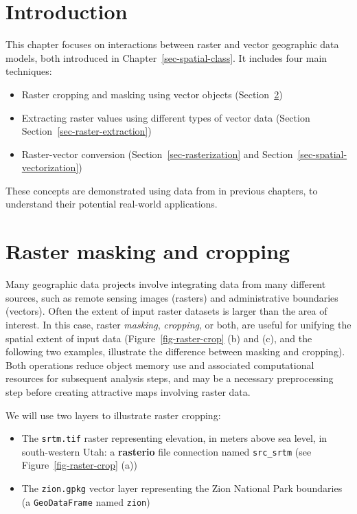 \documentclass[
  letterpaper,
]{krantz}
\providecommand{\tightlist}{%
  \setlength{\itemsep}{0pt}\setlength{\parskip}{0pt}}\usepackage{longtable,booktabs,array}
\begin{document}
\section{Introduction}\label{introduction-4}

This chapter focuses on interactions between raster and vector
geographic data models, both introduced in
Chapter~\ref{sec-spatial-class}. It includes four main techniques:

\begin{itemize}
\tightlist
\item
  Raster cropping and masking using vector objects
  (Section~\ref{sec-raster-cropping})
\item
  Extracting raster values using different types of vector data (Section
  Section~\ref{sec-raster-extraction})
\item
  Raster-vector conversion (Section~\ref{sec-rasterization} and
  Section~\ref{sec-spatial-vectorization})
\end{itemize}

These concepts are demonstrated using data from in previous chapters, to
understand their potential real-world applications.

\section{Raster masking and cropping}\label{sec-raster-cropping}

Many geographic data projects involve integrating data from many
different sources, such as remote sensing images (rasters) and
administrative boundaries (vectors). Often the extent of input raster
datasets is larger than the area of interest. In this case, raster
\emph{masking}, \emph{cropping}, or both, are useful for unifying the
spatial extent of input data (Figure~\ref{fig-raster-crop} (b) and (c),
and the following two examples, illustrate the difference between
masking and cropping). Both operations reduce object memory use and
associated computational resources for subsequent analysis steps, and
may be a necessary preprocessing step before creating attractive maps
involving raster data.

We will use two layers to illustrate raster cropping:

\begin{itemize}
\tightlist
\item
  The \texttt{srtm.tif} raster representing elevation, in meters above
  sea level, in south-western Utah: a \textbf{rasterio} file connection
  named \texttt{src\_srtm} (see Figure~\ref{fig-raster-crop} (a))
\item
  The \texttt{zion.gpkg} vector layer representing the Zion National
  Park boundaries (a \texttt{GeoDataFrame} named \texttt{zion})
\end{itemize}
\end{document}
